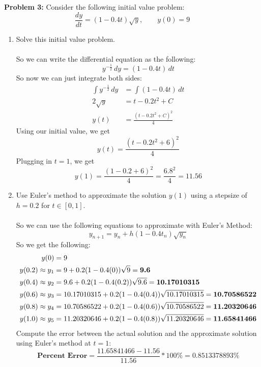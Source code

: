 \documentclass[12pt]{article}
\begin{document}
\newpage

\noindent \textbf{Problem 3: }Consider the following initial value problem: 
	$$
	\frac{dy}{dt} = (1 - 0.4t)\sqrt{y}, \qquad y(0) = 9
	$$
	\begin{enumerate}[label = (\alph*)]
		\item Solve this initial value problem.
		\\ \\
		So we can write the differential equation as the following:
			$$
			y^{-\frac{1}{2}}\,dy = (1 - 0.4t)\,dt
			$$
		So now we can just integrate both sides:
			\begin{align*}
				\int y^{-\frac{1}{2}}\,dy &= \int (1 - 0.4t)\,dt \\
				2\sqrt{y} &= t - 0.2t^2 + C \\
				y(t) &= \frac{(t - 0.2t^2 + C)^2}{4}
			\end{align*}
		Using our initial value, we get 
			\boldmath
			$$
			y(t) = \frac{(t - 0.2t^2 + 6)^2}{4}
			$$
			\unboldmath
		Plugging in $t=1$, we get
			\boldmath
			$$
			y(1) = \frac{(1-0.2+6)^2}{4} = \frac{6.8^2}{4} = 11.56
			$$
			\unboldmath
		\item Use Euler's method to approximate the solution $y(1)$ using a stepsize of $h = 0.2$ for $t \in [0,1]$.
		\\ \\
		So we can use the following equations to approximate with Euler's Method:
			$$
			y_{n+1} = y_n + h(1 - 0.4t_n)\sqrt{y_n}
			$$
		So we get the following:
			\begin{align*}
				y(0) &= 9 \\
				y(0.2) \approx y_1 &= 9 + 0.2(1 - 0.4(0))\sqrt{9} = \text{\boldmath $9.6$} \\
				y(0.4) \approx y_2 &= 9.6 + 0.2(1 - 0.4(0.2))\sqrt{9.6} = \text{\boldmath $10.17010315$} \\
				y(0.6) \approx y_3 &= 10.17010315 + 0.2(1 - 0.4(0.4))\sqrt{10.17010315} = \text{\boldmath $10.70586522$} \\
				y(0.8) \approx y_4 &= 10.70586522 + 0.2(1 - 0.4(0.6))\sqrt{10.70586522} = \text{\boldmath $11.20320646$} \\
				y(1.0) \approx y_5 &= 11.20320646 + 0.2(1 - 0.4(0.8))\sqrt{11.20320646} =  \text{\boldmath $11.65841466$}
			\end{align*}
		Compute the error between the actual solution and the approximate solution using Euler's method at $t=1$:
			\boldmath
			$$
			\textbf{Percent Error} = \frac{11.65841466 - 11.56}{11.56}*100\% = 0.8513378893\%
			$$
			\unboldmath
	\end{enumerate}
\end{document}
